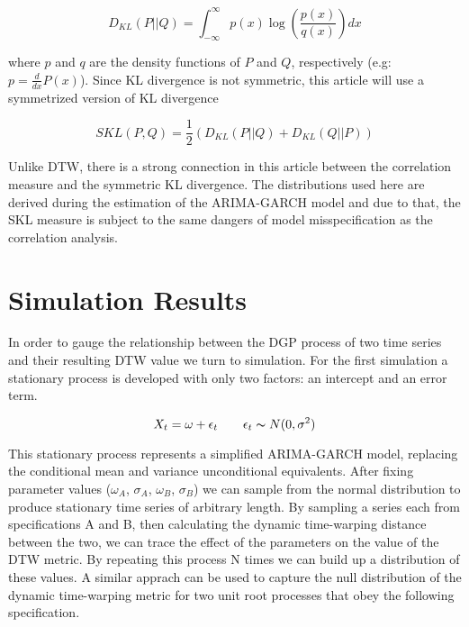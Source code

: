 \documentclass[12pt]{article}
\begin{document}
\begin{equation}
    D_{KL}(P || Q) = \int_{-\infty}^{\infty} p(x) \log \left( \frac{p(x)}{q(x)} \right) dx
\end{equation}

where $p$ and $q$ are the density functions of $P$ and $Q$, respectively (e.g: $p = \frac{d}{dx}P(x)$). Since KL divergence is not symmetric, this article will use a symmetrized version of KL divergence

\begin{equation}
    SKL(P, Q) = \frac{1}{2} \left( D_{KL}(P || Q) + D_{KL}(Q || P) \right)
\end{equation}

Unlike DTW, there is a strong connection in this article between the correlation measure and the symmetric KL divergence. The distributions used here are derived during the estimation of the ARIMA-GARCH model and due to that, the SKL measure is subject to the same dangers of model misspecification as the correlation analysis.


\section{Simulation Results}
In order to gauge the relationship between the DGP process of two time series and their resulting DTW value we turn to simulation. For the first simulation a stationary process is developed with only two factors: an intercept and an error term.

\begin{equation}
    X_{t} = \omega + \epsilon_{t} \qquad \epsilon_{t} \thicksim N(0, \sigma^{2})
\end{equation}

This stationary process represents a simplified ARIMA-GARCH model, replacing the conditional mean and variance unconditional equivalents. After fixing parameter values ($\omega_{A}$, $\sigma_{A}$, $\omega_{B}$, $\sigma_{B}$) we can sample from the normal distribution to produce stationary time series of arbitrary length. By sampling a series each from specifications A and B, then calculating the dynamic time-warping distance between the two, we can trace the effect of the parameters on the value of the DTW metric. By repeating this process N times we can build up a distribution of these values. A similar apprach can be used to capture the null distribution of the dynamic time-warping metric for two unit root processes that obey the following specification.
\end{document}
